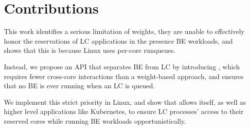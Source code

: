 \section{Contributions}

This work identifies a serious limitation of \cgroups{} weights, they are unable
to effectively honor the reservations of LC applications in the presence BE
workloads, and shows that this is because Linux uses per-core runqueues. 

Instead, we propose an API that separates BE from LC by introducing \beclass{},
which requires fewer cross-core interactions than a weight-based approach, and
ensures that no BE is ever running when an LC is queued.

We implement this strict priority in Linux, and show that \beclass{} allows
\cgroups{} itself, as well as higher level applications like Kubernetes, to
ensure LC processes' access to their reserved cores while running BE workloads
opportunistically.
